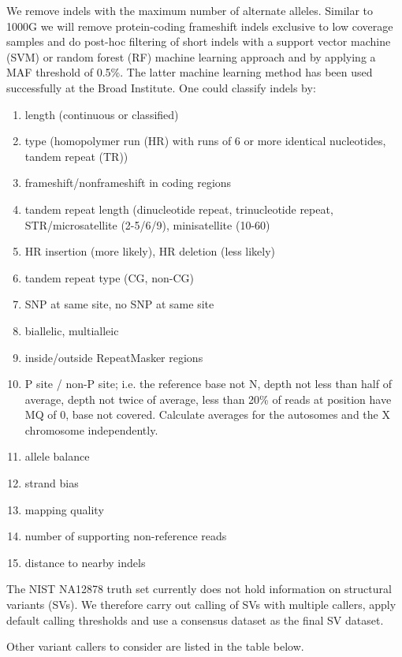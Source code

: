 We remove indels with the maximum number of alternate alleles.
Similar to 1000G we will remove protein-coding frameshift indels exclusive to low coverage samples and do post-hoc filtering of short indels with a support vector machine (SVM) or random forest (RF) machine learning approach and by applying a MAF threshold of 0.5\%. The latter machine learning method has been used successfully at the Broad Institute. One could classify indels by:
\begin{enumerate}
\item length (continuous or classified)
\item type (homopolymer run (HR) with runs of 6 or more identical nucleotides, tandem repeat (TR))
\item frameshift/nonframeshift in coding regions
\item tandem repeat length (dinucleotide repeat, trinucleotide repeat, STR/microsatellite (2-5/6/9), minisatellite (10-60)
\item HR insertion (more likely), HR deletion (less likely)
\item tandem repeat type (CG, non-CG)
\item SNP at same site, no SNP at same site
\item biallelic, multialleic
\item inside/outside RepeatMasker regions
\item P site / non-P site; i.e. the reference base not N, depth not less than half of average, depth not twice of average, less than 20\% of reads at position have MQ of 0, base not covered. Calculate averages for the autosomes and the X chromosome independently.
\item allele balance
\item strand bias
\item mapping quality
\item number of supporting non-reference reads
\item distance to nearby indels
\end{enumerate}

The NIST NA12878 truth set currently does not hold information on structural variants (SVs). We therefore carry out calling of SVs with multiple callers, apply default calling thresholds and use a consensus dataset as the final SV dataset.

Other variant callers to consider are listed in the table below.
